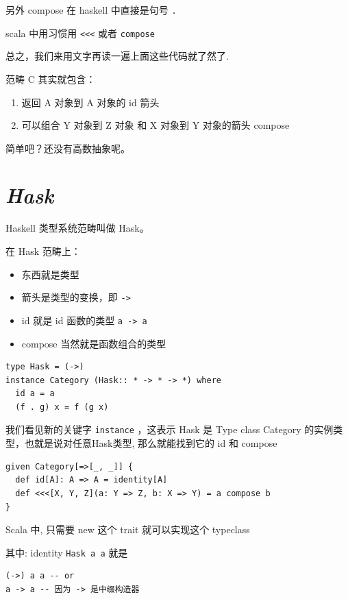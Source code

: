\documentclass[letterspacing]{tufte-book}
\begin{document}
另外 compose 在 haskell 中直接是句号 \texttt{.}

scala 中用习惯用 \texttt{<<<} 或者 \texttt{compose}

总之，我们来用文字再读一遍上面这些代码就了然了.

范畴 C 其实就包含：
\begin{enumerate}
\item 返回 A 对象到 A 对象的 id 箭头
\item 可以组合 Y 对象到 Z 对象 和 X 对象到 Y 对象的箭头 compose
\end{enumerate}

简单吧？还没有高数抽象呢。

\section{\emph{Hask}}
\label{sec:org2bda925}
Haskell 类型系统范畴叫做 Hask。

在 Hask 范畴上：

\begin{itemize}
\item 东西就是类型
\item 箭头是类型的变换，即 \texttt{->}
\item id 就是 id 函数的类型 \texttt{a -> a}
\item compose 当然就是函数组合的类型
\end{itemize}

\lstset{language=haskell,label= ,caption= ,captionpos=b,numbers=none}
\begin{lstlisting}
type Hask = (->)
instance Category (Hask:: * -> * -> *) where
  id a = a
  (f . g) x = f (g x)
\end{lstlisting}

我们看见新的关键字 \texttt{instance} ，这表示 Hask 是 Type class Category 的实例类型，也就是说对任意Hask类型, 那么就能找到它的 id 和 compose

\lstset{language=scala,label= ,caption= ,captionpos=b,numbers=none}
\begin{lstlisting}
given Category[=>[_, _]] {
  def id[A]: A => A = identity[A]
  def <<<[X, Y, Z](a: Y => Z, b: X => Y) = a compose b
}
\end{lstlisting}

Scala 中, 只需要 new 这个 trait 就可以实现这个 typeclass

其中: identity \texttt{Hask a a} 就是
\lstset{language=haskell,label= ,caption= ,captionpos=b,numbers=none}
\begin{lstlisting}
(->) a a -- or
a -> a -- 因为 -> 是中缀构造器
\end{lstlisting}
\end{document}
